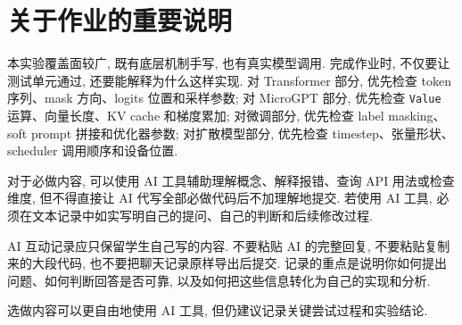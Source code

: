 \documentclass{../../nndlcourse}
\begin{document}
\section{关于作业的重要说明}

本实验覆盖面较广, 既有底层机制手写, 也有真实模型调用. 完成作业时, 不仅要让测试单元通过, 还要能解释为什么这样实现. 对 Transformer 部分, 优先检查 token 序列、mask 方向、logits 位置和采样参数; 对 MicroGPT 部分, 优先检查 \texttt{Value} 运算、向量长度、KV cache 和梯度累加; 对微调部分, 优先检查 label masking、soft prompt 拼接和优化器参数; 对扩散模型部分, 优先检查 timestep、张量形状、scheduler 调用顺序和设备位置.

对于必做内容, 可以使用 AI 工具辅助理解概念、解释报错、查询 API 用法或检查维度, 但不得直接让 AI 代写全部必做代码后不加理解地提交. 若使用 AI 工具, 必须在文本记录中如实写明自己的提问、自己的判断和后续修改过程.

AI 互动记录应只保留学生自己写的内容. 不要粘贴 AI 的完整回复, 不要粘贴复制来的大段代码, 也不要把聊天记录原样导出后提交. 记录的重点是说明你如何提出问题、如何判断回答是否可靠, 以及如何把这些信息转化为自己的实现和分析.

选做内容可以更自由地使用 AI 工具, 但仍建议记录关键尝试过程和实验结论.
\end{document}
